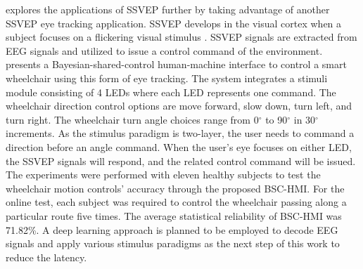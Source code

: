 \textcite{deng_bayesian_2020} explores the applications of SSVEP further by taking advantage of another SSVEP eye tracking application. SSVEP develops in the visual cortex when a subject focuses on a flickering visual stimulus \parencite{nakanishi_high-speed_2014}. SSVEP signals are extracted from EEG signals and utilized to issue a control command of the environment. \textcite{deng_bayesian_2020} presents a Bayesian-shared-control human-machine interface to control a smart wheelchair using this form of eye tracking. The system integrates a stimuli module consisting of 4 LEDs where each LED represents one command. The wheelchair direction control options are move forward, slow down, turn left, and turn right. The wheelchair turn angle choices range from 0$^{\circ}$ to  90$^{\circ}$ in 30$^{\circ}$ increments. As the stimulus paradigm is two-layer, the user needs to command a direction before an angle command. When the user's eye focuses on either LED, the SSVEP signals will respond, and the related control command will be issued. The experiments were performed with eleven healthy subjects to test the wheelchair motion controls'  accuracy through the proposed BSC-HMI. For the online test, each subject was required to control the wheelchair passing along a particular route five times. The average statistical reliability of BSC-HMI was 71.82\%.  A deep learning approach is planned to be employed to decode EEG signals and apply various stimulus paradigms as the next step of this work to reduce the latency.


